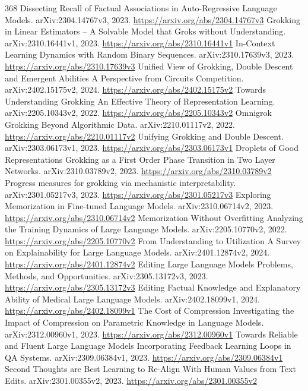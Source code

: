 \documentclass[11pt]{article}
\begin{document}
\begin{thebibliography}{368}
 Dissecting Recall of Factual Associations in Auto-Regressive Language Models. arXiv:2304.14767v3, 2023. \url{https://arxiv.org/abs/2304.14767v3}
 Grokking in Linear Estimators -- A Solvable Model that Groks without Understanding. arXiv:2310.16441v1, 2023. \url{https://arxiv.org/abs/2310.16441v1}
 In-Context Learning Dynamics with Random Binary Sequences. arXiv:2310.17639v3, 2023. \url{https://arxiv.org/abs/2310.17639v3}
 Unified View of Grokking, Double Descent and Emergent Abilities A Perspective from Circuits Competition. arXiv:2402.15175v2, 2024. \url{https://arxiv.org/abs/2402.15175v2}
 Towards Understanding Grokking An Effective Theory of Representation Learning. arXiv:2205.10343v2, 2022. \url{https://arxiv.org/abs/2205.10343v2}
 Omnigrok Grokking Beyond Algorithmic Data. arXiv:2210.01117v2, 2022. \url{https://arxiv.org/abs/2210.01117v2}
 Unifying Grokking and Double Descent. arXiv:2303.06173v1, 2023. \url{https://arxiv.org/abs/2303.06173v1}
 Droplets of Good Representations Grokking as a First Order Phase Transition in Two Layer Networks. arXiv:2310.03789v2, 2023. \url{https://arxiv.org/abs/2310.03789v2}
 Progress measures for grokking via mechanistic interpretability. arXiv:2301.05217v3, 2023. \url{https://arxiv.org/abs/2301.05217v3}
 Exploring Memorization in Fine-tuned Language Models. arXiv:2310.06714v2, 2023. \url{https://arxiv.org/abs/2310.06714v2}
 Memorization Without Overfitting Analyzing the Training Dynamics of Large Language Models. arXiv:2205.10770v2, 2022. \url{https://arxiv.org/abs/2205.10770v2}
 From Understanding to Utilization A Survey on Explainability for Large Language Models. arXiv:2401.12874v2, 2024. \url{https://arxiv.org/abs/2401.12874v2}
 Editing Large Language Models Problems, Methods, and Opportunities. arXiv:2305.13172v3, 2023. \url{https://arxiv.org/abs/2305.13172v3}
 Editing Factual Knowledge and Explanatory Ability of Medical Large Language Models. arXiv:2402.18099v1, 2024. \url{https://arxiv.org/abs/2402.18099v1}
 The Cost of Compression Investigating the Impact of Compression on Parametric Knowledge in Language Models. arXiv:2312.00960v1, 2023. \url{https://arxiv.org/abs/2312.00960v1}
 Towards Reliable and Fluent Large Language Models Incorporating Feedback Learning Loops in QA Systems. arXiv:2309.06384v1, 2023. \url{https://arxiv.org/abs/2309.06384v1}
 Second Thoughts are Best Learning to Re-Align With Human Values from Text Edits. arXiv:2301.00355v2, 2023. \url{https://arxiv.org/abs/2301.00355v2}

\end{thebibliography}
\end{document}
